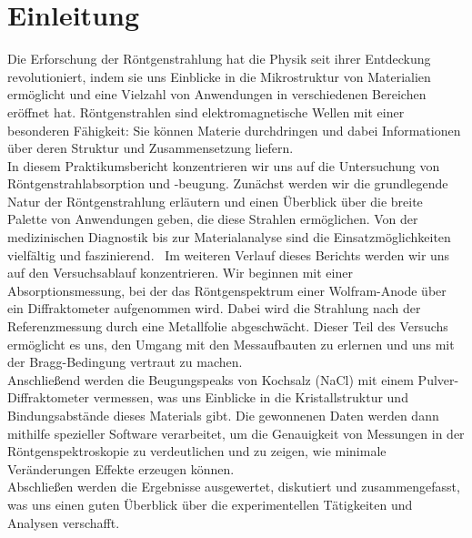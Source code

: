 \section{\label{sec:einleitung}Einleitung}
Die Erforschung der Röntgenstrahlung hat die Physik seit ihrer Entdeckung revolutioniert, 
indem sie uns Einblicke in die Mikrostruktur von Materialien ermöglicht und eine Vielzahl 
von Anwendungen in verschiedenen Bereichen eröffnet hat. 
Röntgenstrahlen sind elektromagnetische Wellen mit einer besonderen Fähigkeit: Sie können 
Materie durchdringen und dabei Informationen über deren Struktur und Zusammensetzung liefern.\\
In diesem Praktikumsbericht konzentrieren wir uns auf die Untersuchung von Röntgenstrahlabsorption 
und -beugung. 
Zunächst werden wir die grundlegende Natur der Röntgenstrahlung erläutern und einen Überblick 
über die breite Palette von Anwendungen geben, die diese Strahlen ermöglichen. 
Von der medizinischen Diagnostik bis zur Materialanalyse sind die Einsatzmöglichkeiten vielfältig und faszinierend. \
Im weiteren Verlauf dieses Berichts werden wir uns auf den Versuchsablauf konzentrieren. 
Wir beginnen mit einer Absorptionsmessung, bei der das Röntgenspektrum einer Wolfram-Anode über ein Diffraktometer 
aufgenommen wird. 
Dabei wird die Strahlung nach der Referenzmessung durch eine Metallfolie abgeschwächt. 
Dieser Teil des Versuchs ermöglicht es uns, den Umgang mit den Messaufbauten zu erlernen und uns mit 
der Bragg-Bedingung vertraut zu machen. \\
Anschließend werden die Beugungspeaks von Kochsalz (NaCl) mit einem Pulver-Diffraktometer vermessen, 
was uns Einblicke in die Kristallstruktur und Bindungsabstände dieses Materials gibt. 
Die gewonnenen Daten werden dann mithilfe spezieller Software verarbeitet, um die Genauigkeit von 
Messungen in der Röntgenspektroskopie zu verdeutlichen und zu zeigen, wie minimale Veränderungen Effekte erzeugen können. \\
Abschließen werden die Ergebnisse ausgewertet, diskutiert und zusammengefasst, was uns einen 
guten Überblick über die experimentellen Tätigkeiten und Analysen verschafft.  